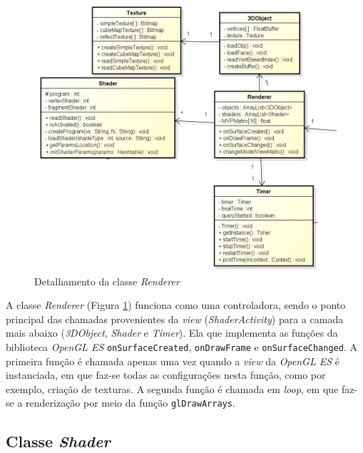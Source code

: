 	\begin{figure}[h]
	\centering
		\includegraphics[keepaspectratio=true,scale=0.6]{figuras/renderer.jpg}
	\caption{Detalhamento da classe \textit{Renderer}}
	\label{renderer}
	\end{figure}

	A classe \textit{Renderer} (Figura \ref{renderer}) funciona como uma controladora, sendo o ponto principal  das chamadas provenientes da \textit{view} (\textit{ShaderActivity}) para a camada mais abaixo (\textit{3DObject}, \textit{Shader} e \textit{Timer}). Ela que implementa as funções da biblioteca \textit{OpenGL ES} \texttt{onSurfaceCreated},  \texttt{onDrawFrame} e \texttt{onSurfaceChanged}. A primeira função é chamada apenas uma vez quando a \textit{view} da \textit{OpenGL ES} é instanciada, em que faz-se todas as configurações nesta função, como por exemplo, criação de texturas. A segunda função é chamada em \textit{loop}, em que faz-se a renderização por meio da função \texttt{glDrawArrays}. 

\subsection{Classe \textit{Shader}}      

